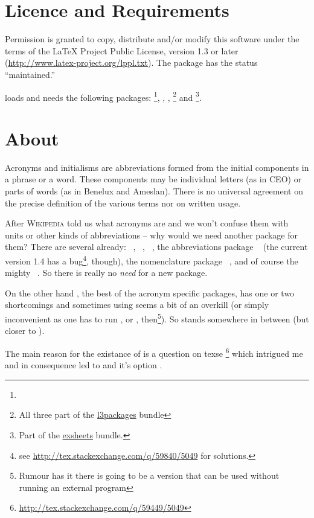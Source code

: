 \documentclass[DIV10,toc=index,toc=bib,hyperfootnotes=false]{cnpkgdoc}
\newcommand*\wikipedia{%
\textsc{Wikipedia}}
\newcommand*\CTANlink[1]{\href{http://www.ctan.org/pkg/#1}{#1}}
\begin{document}
\section{Licence and Requirements}
Permission is granted to copy, distribute and/or modify this software under the
terms of the \LaTeX{} Project Public License, version 1.3 or later
(\url{http://www.latex-project.org/lppl.txt}). The package has the status
``maintained.''

\acro loads and needs the following packages: \footnote{},
, , \footnote{All three part of
the \CTANlink{l3packages} bundle} and \footnote{Part of the
\CTANlink{exsheets} bundle.}.

\section{About}
\begin{zitat}
 Acronyms and initialisms are abbreviations formed from the initial components
 in a phrase or a word. These components may be individual letters (as in CEO)
 or parts of words (as in Benelux and Ameslan). There is no universal agreement
 on the precise definition of the various terms nor on written usage.
\end{zitat}
After \wikipedia{} told us what acronyms are and we won't confuse them with units
or other kinds of abbreviations -- why would we need another package for them?
There are several already: ~\cite{acronym}, %
~\cite{acromake}, ~\cite{acroterm}, the abbreviations package
~\cite{abbrevs} (the current version 1.4 has a bug\footnote{see
\url{http://tex.stackexchange.com/q/59840/5049} for solutions.}, though), the
nomenclature package ~\cite{nomencl}, and of course the mighty
~\cite{glossaries}. So there is really no \emph{need} for a
new package.

On the other hand , the best of the acronym specific packages,
has one or two shortcomings and sometimes using  seems a bit
of an overkill (or simply inconvenient as one has to run ,
 or , then\footnote{Rumour has it there is going to
be a version that can be used without running an external program}). So \acro
stands somewhere in between (but closer to ).

The main reason for the existance of \acro is a question on \acs{texse}%
\footnote{\url{http://tex.stackexchange.com/q/59449/5049}} which intrigued
me and in consequence led to \acro and it's option .
\end{document}
